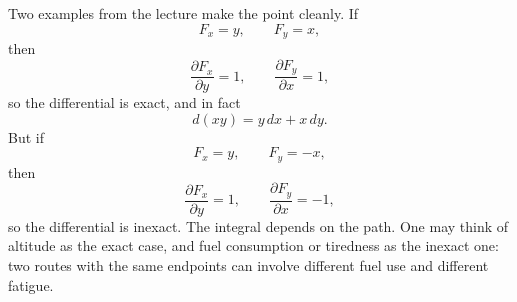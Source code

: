 Two examples from the lecture make the point cleanly. If
\begin{equation}
F_x=y,\qquad F_y=x,
\end{equation}
then
\begin{equation}
\frac{\partial F_x}{\partial y}=1,\qquad \frac{\partial F_y}{\partial x}=1,
\end{equation}
so the differential is exact, and in fact
\begin{equation}
d(xy)=y\,dx+x\,dy.
\end{equation}
But if
\begin{equation}
F_x=y,\qquad F_y=-x,
\end{equation}
then
\begin{equation}
\frac{\partial F_x}{\partial y}=1,\qquad \frac{\partial F_y}{\partial x}=-1,
\end{equation}
so the differential is inexact. The integral depends on the path. One may think of altitude as the exact case, and fuel consumption or tiredness as the inexact one: two routes with the same endpoints can involve different fuel use and different fatigue.

